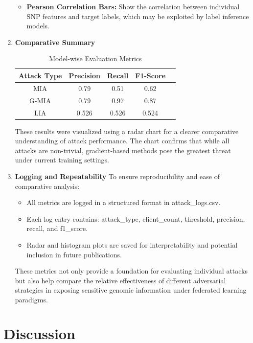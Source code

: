\documentclass[conference]{IEEEtran}
\begin{document}
\begin{enumerate}
\begin{itemize}
        \item \textbf{Pearson Correlation Bars:} Show the correlation between individual SNP features and target labels, which may be exploited by label inference models.
    \end{itemize}
    \item \textbf{Comparative Summary}
    \begin{table}[htbp]
    \centering
    \begin{tabular}{ccccc}
      \toprule
      Attack Type & Precision & Recall & F1-Score  \\
      \midrule
      MIA & 0.79 & 0.51 & 0.62 \\
      G-MIA & 0.79 & 0.97 & 0.87  \\
      LIA & 0.526 & 0.526 & 0.524  \\
      \bottomrule
    \end{tabular}
    \caption{Model-wise Evaluation Metrics}
    \label{tab:model_metrics}
  \end{table}
  \newline
    These results were visualized using a radar chart for a clearer comparative understanding of attack performance. The chart confirms that while all attacks are non-trivial, gradient-based methods pose the greatest threat under current training settings.
    \newline
    \item \textbf{Logging and Repeatability}
    \newline
    To ensure reproducibility and ease of comparative analysis:
    \begin{itemize}
        \item All metrics are logged in a structured format in attack\_logs.csv.
        \item Each log entry contains: attack\_type, client\_count, threshold, precision, recall, and f1\_score.
        \item Radar and histogram plots are saved for interpretability and potential inclusion in future publications.
    \end{itemize}
    These metrics not only provide a foundation for evaluating individual attacks but also help compare the relative effectiveness of different adversarial strategies in exposing sensitive genomic information under federated learning paradigms.
\end{enumerate}

\section{Discussion}
\end{document}
